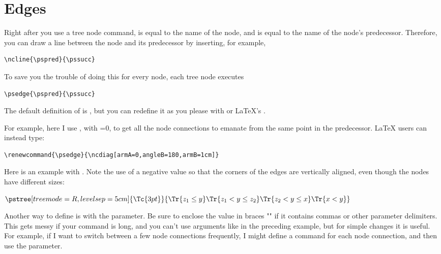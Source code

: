 \documentclass[11pt,english,BCOR10mm,DIV12,bibliography=totoc,parskip=false,smallheadings
    headexclude,footexclude,oneside]{pst-doc}
\begin{document}
\section{Edges}

Right after you use a tree node command,  is equal to the name of the
node, and  is equal to the name of the node's predecessor. Therefore,
you can draw a line between the node and its predecessor by inserting, for
example,

\begin{lstlisting}[style=syntax]
\ncline{\pspred}{\pssucc}
\end{lstlisting}

To save you the trouble of doing this for every node, each tree node executes
\begin{lstlisting}[style=syntax]
  \psedge{\pspred}{\pssucc}
\end{lstlisting}
The default definition of  is , but you can redefine it as
you please with  or \LaTeX's .

For example, here I use , with =0, to get all the node
connections to emanate from the same point in the predecessor. \LaTeX{} users can instead type:
\begin{lstlisting}[style=syntax]
\renewcommand{\psedge}{\ncdiag[armA=0,angleB=180,armB=1cm]}
\end{lstlisting}


\begin{LTXexample}[pos=l,width=0.4\linewidth]
  \def\psedge{\ncdiag[armA=0,angleB=180,armB=1cm]}
\end{LTXexample}

Here is an example with . Note the use of a negative  value
so that the corners of the edges are vertically aligned, even though the nodes
have different sizes:

\begin{LTXexample}
$
\def\psedge#1#2{\ncdiagg[angleA=180,armA=1cm,nodesep=4pt]{#2}{#1}}
\pstree[treemode=R, levelsep=5cm]{\Tc{3pt}}{%
  \Tr{z_1\leq y}  \Tr{z_1<y\leq z_2}   \Tr{z_2<y\leq x}   \Tr{x<y}
}
$
\end{LTXexample}

Another way to define \Largb{} is with the 
parameter. Be sure to enclose the value in braces "{}" if it contains commas
or other parameter delimiters. This gets messy if your command is long, and
you can't use arguments like in the preceding example, but for simple changes
it is useful. For example, if I want to switch between a few node connections
frequently, I might define a command for each node connection, and then use
the  parameter.
\end{document}
